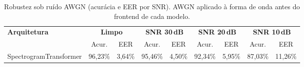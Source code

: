 \begin{table}[H]
\centering
\caption{Robustez sob ruído AWGN (acurácia e EER por SNR). AWGN aplicado à forma de onda antes do frontend de cada modelo.}
\label{tab:bench_robustez}
\small\singlespacing
\begin{tabular}{lcccccccc}
\toprule
\multirow{2}{*}{\textbf{Arquitetura}} & \multicolumn{2}{c}{\textbf{Limpo}} & \multicolumn{2}{c}{\textbf{SNR 30\,dB}} & \multicolumn{2}{c}{\textbf{SNR 20\,dB}} & \multicolumn{2}{c}{\textbf{SNR 10\,dB}} \\
\cmidrule(lr){2-3}\cmidrule(lr){4-5}\cmidrule(lr){6-7}\cmidrule(lr){8-9}
 & Acur. & EER & Acur. & EER & Acur. & EER & Acur. & EER \\
\midrule
SpectrogramTransformer & 96,23\% & 3,64\% & 95,46\% & 4,50\% & 92,34\% & 5,95\% & 87,03\% & 11,26\% \\
\bottomrule
\end{tabular}
\end{table}

